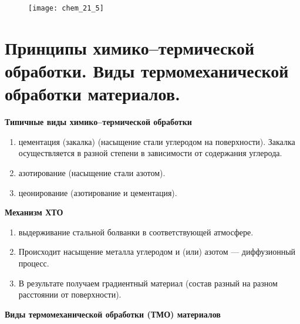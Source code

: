 \begin{figure}[h!]
    \centering
    \texttt{[image: chem\_21\_5]}
\end{figure}



\section{Принципы химико--термической обработки. Виды термомеханической обработки материалов.}

\textbf{Типичные виды химико--термической обработки}

\begin{enumerate}
    \item цементация (закалка) (насыщение стали углеродом на поверхности). Закалка осуществляется в разной степени в зависимости от содержания углерода.
    \item азотирование (насыщение стали азотом).
    \item цеонирование 	(азотирование и цементация).
    
\end{enumerate}

\textbf{Механизм ХТО}

\begin{enumerate}
    \item выдерживание стальной болванки в соответствующей атмосфере.
    \item Происходит насыщение металла углеродом и (или) азотом --- 
диффузионный процесс.
    \item В результате получаем градиентный материал (состав разный на разном расстоянии от поверхности).  
\end{enumerate}

\textbf{Виды термомеханической обработки (ТМО) материалов}


